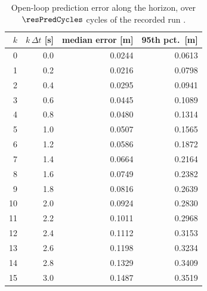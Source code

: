 \begin{table}[htbp]
  \centering
  \small
  \caption{Open-loop prediction error along the horizon, over $\resPredCycles$ cycles of the recorded run \resBag.}
  \label{res:tab:pred}
  \begin{tabular}{rrrr}
    \toprule
    $k$ & $k\,\Delta t$ [s] & median error [m] & 95th pct.\ [m] \\
    \midrule
    0 & 0.0 & 0.0244 & 0.0613 \\
    1 & 0.2 & 0.0216 & 0.0798 \\
    2 & 0.4 & 0.0295 & 0.0941 \\
    3 & 0.6 & 0.0445 & 0.1089 \\
    4 & 0.8 & 0.0480 & 0.1314 \\
    5 & 1.0 & 0.0507 & 0.1565 \\
    6 & 1.2 & 0.0586 & 0.1872 \\
    7 & 1.4 & 0.0664 & 0.2164 \\
    8 & 1.6 & 0.0749 & 0.2382 \\
    9 & 1.8 & 0.0816 & 0.2639 \\
    10 & 2.0 & 0.0924 & 0.2830 \\
    11 & 2.2 & 0.1011 & 0.2968 \\
    12 & 2.4 & 0.1112 & 0.3153 \\
    13 & 2.6 & 0.1198 & 0.3234 \\
    14 & 2.8 & 0.1329 & 0.3409 \\
    15 & 3.0 & 0.1487 & 0.3519 \\
    \bottomrule
  \end{tabular}
\end{table}

